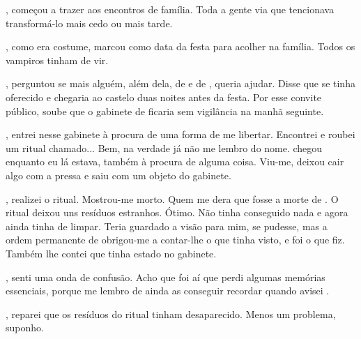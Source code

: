 {,  começou a trazer  aos encontros de família. Toda a gente via que tencionava transformá-lo mais cedo ou mais tarde.

, como era costume,  marcou  como data da festa para acolher  na família. Todos os vampiros tinham de vir.

,  perguntou se mais alguém, além dela, de  e de , queria ajudar. Disse que  se tinha oferecido e chegaria ao castelo duas noites antes da festa. Por esse convite público, soube que o gabinete de  ficaria sem vigilância na manhã seguinte.

, entrei nesse gabinete à procura de uma forma de me libertar. Encontrei e roubei um ritual chamado... Bem, na verdade já não me lembro do nome.  chegou enquanto eu lá estava, também à procura de alguma coisa. Viu-me, deixou cair algo com a pressa e saiu com um objeto do gabinete.

, realizei o ritual. Mostrou-me  morto. Quem me dera que fosse a morte de . O ritual deixou uns resíduos estranhos. Ótimo. Não tinha conseguido nada e agora ainda tinha de limpar. Teria guardado a visão para mim, se pudesse, mas a ordem permanente de  obrigou-me a contar-lhe o que tinha visto, e foi o que fiz. Também lhe contei que  tinha estado no gabinete.

, senti uma onda de confusão. Acho que foi aí que perdi algumas memórias essenciais, porque me lembro de ainda as conseguir recordar quando avisei .

, reparei que os resíduos do ritual tinham desaparecido. Menos um problema, suponho.

}
